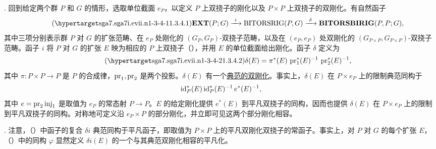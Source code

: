 . 回到给定两个群 $P$ 和 $G$ 的情形，选取单位截面 $e_P$，以定义 $P$ 上双挠子的刚化以及 $P\times P$ 上双挠子的双刚化。有自然函子
\begin{equation}\tag{\SGARefTarget{sga7.sga7i.evii.n1-3-4-1}{1.3.4.1}}
 \mathbf{EXT}(P;G)\xrightarrow{\ i\ }
 \mathrm{BITORSRIG}(P,G)\xrightarrow{\ \delta\ }
 \mathbf{BITORSBIRIG}(P,P;G),
\end{equation}
其中三项分别表示群 $P$ 对 $G$ 的扩张范畴、在 $e_P$ 处刚化的 $(G_P,G_P)$-双挠子范畴，以及在 $(e_P,e_P)$ 处双刚化的 $(G_{P\times P},G_{P\times P})$-双挠子范畴。函子 $i$ 将 $P$ 对 $G$ 的扩张 $E$ 映为相应的 $P$ 上双挠子（），并用 $E$ 的单位截面给出刚化。函子 $\delta$ 定义为
\begin{equation}\tag{\SGARefTarget{sga7.sga7i.evii.n1-3-4-2}{1.3.4.2}}
 \delta(E)=\pi^*(E)\,\pr_1^*(E)^{-1}\,\pr_2^*(E)^{-1},
\end{equation}
其中 $\pi:P\times P\longrightarrow P$ 是 $P$ 的合成律，$\operatorname{pr}_1,\operatorname{pr}_2$ 是两个投影。$\delta(E)$ 有一个\underline{典范的双刚化}。事实上，$\delta(E)$ 在 $P\times e_P$ 上的限制典范同构于
\[
 \mathrm{id}_P^*(E)\,\mathrm{id}_P^*(E)^{-1}\,e^*(E)^{-1},
\]
其中 $e=\operatorname{pr}_2\operatorname{inj}_1$ 是取值为 $e_P$ 的常态射 $P\longrightarrow P$。$E$ 的给定刚化提供 $e^*(E)$ 到平凡双挠子的同构，因而也提供 $\delta(E)$ 在 $P\times e_P$ 上的限制到平凡双挠子的同构。对称地可定义沿 $e_P\times P$ 的部分刚化，并立即可见这两个部分刚化相容。


. 注意，（）中函子的复合 $\delta i$ 典范同构于平凡函子，即取值为 $P\times P$ 上的平凡双刚化双挠子的常函子。事实上，对 $P$ 对 $G$ 的每个扩张 $E$，（）中的同构 $\varphi$ 显然定义 $\delta i(E)$ 的一个与其典范双刚化相容的平凡化。




